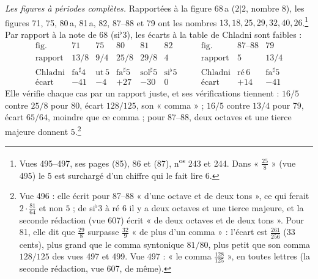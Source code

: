 \documentclass[11pt,a4paper]{article}
\begin{document}
\emph{Les figures à périodes complètes.} Rapportées à la figure 68\,a ($2|2$,
nombre $8$), les figures 71, 75, 80\,a, 81\,a, 82, 87--88 et 79 ont les nombres
$13, 18, 25, 29, 32, 40, 26$.\footnote{Vues 495--497, ses pages (85), 86 et (87),
n\textsuperscript{os} 243 et 244. Dans « $\frac{25}{8}$ » (vue 495) le 5 est
surchargé d'un chiffre qui le fait lire 6.} Par rapport à la note de 68
(si$^{\flat}$3), les écarts à la table de Chladni sont faibles :
\[
\begin{array}{lccccc}
\text{fig.} & 71 & 75 & 80 & 81 & 82\\
\text{rapport} & 13/8 & 9/4 & 25/8 & 29/8 & 4\\
\text{Chladni} & \text{fa}^{\sharp}4 & \text{ut}\,5 & \text{fa}^{\sharp}5 & \text{sol}^{\sharp}5 & \text{si}^{\flat}5\\
\text{écart} & -41 & -4 & +27 & -30 & 0
\end{array}
\qquad
\begin{array}{lcc}
\text{fig.} & 87\text{--}88 & 79\\
\text{rapport} & 5 & 13/4\\
\text{Chladni} & \text{ré}\,6 & \text{fa}^{\sharp}5\\
\text{écart} & +14 & -41
\end{array}
\]
Elle vérifie chaque cas par un rapport juste, et ses vérifications tiennent :
$16/5$ contre $25/8$ pour 80, écart $128/125$, son « comma » ; $16/5$ contre
$13/4$ pour 79, écart $65/64$, moindre que ce comma ; pour 87--88, deux octaves et
une tierce majeure donnent $5$.\footnote{Vue 496 : elle écrit pour 87--88
« d'une octave et de deux tons », ce qui ferait $2\cdot\frac{81}{64}$ et non
$5$ ; de si$^{\flat}$3 à ré 6 il y a deux octaves et une tierce majeure, et la
seconde rédaction (vue 607) écrit « de deux octaves et de deux tons ». Pour 81,
elle dit que $\frac{29}{8}$ surpasse $\frac{32}{9}$ « de plus d'un comma » :
l'écart est $\frac{261}{256}$ (33 cents), plus grand que le comma syntonique
$81/80$, plus petit que son comma $128/125$ des vues 497 et 499. Vue 497 : « le
comma $\frac{128}{125}$ », en toutes lettres (la seconde rédaction, vue 607,
de même).}
\end{document}
